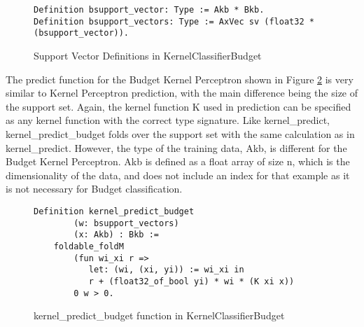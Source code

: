 \begin{figure}
    \caption{Support Vector Definitions in KernelClassifierBudget}
    \label{KPBsupportDef}
    \begin{lstlisting}
Definition bsupport_vector: Type := Akb * Bkb.
Definition bsupport_vectors: Type := AxVec sv (float32 * (bsupport_vector)).
    \end{lstlisting}
\end{figure}

The predict function for the Budget Kernel Perceptron shown in Figure \ref{kernel_predict_budgetDef} is very similar to Kernel Perceptron prediction, with the main difference being the size of the support set. Again, the kernel function K used in prediction can be specified as any kernel function with the correct type signature. Like kernel\_predict, kernel\_predict\_budget folds over the support set with the same calculation as in kernel\_predict. However, the type of the training data, Akb, is different for the Budget Kernel Perceptron. Akb is defined as a float array of size n, which is the dimensionality of the data, and does not include an index for that example as it is not necessary for Budget classification.

\begin{figure}
    \caption{kernel\_predict\_budget function in KernelClassifierBudget}
    \label{kernel_predict_budgetDef}
    \begin{lstlisting}
Definition kernel_predict_budget
        (w: bsupport_vectors)
        (x: Akb) : Bkb :=
    foldable_foldM
        (fun wi_xi r =>
           let: (wi, (xi, yi)) := wi_xi in 
           r + (float32_of_bool yi) * wi * (K xi x))
        0 w > 0.
    \end{lstlisting}
\end{figure}

